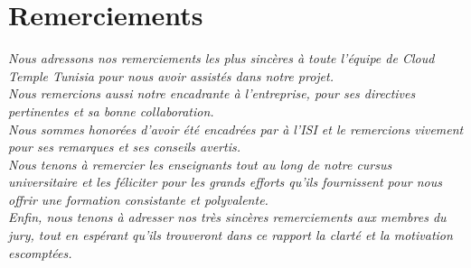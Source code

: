 \chapter*{\huge Remerciements}

\begin{center}
\it \Large
Nous adressons nos remerciements les plus sincères à toute l’équipe de Cloud Temple Tunisia pour nous avoir assistés dans notre projet.\\
\vskip12mm
Nous remercions aussi \textbf{\@proFramerName} notre encadrante à l’entreprise, pour ses directives pertinentes et sa bonne collaboration.\\
\vskip12mm
Nous sommes honorées d’avoir été encadrées par \textbf{\@academicFramerName} à l’ISI et le remercions vivement pour ses remarques et ses conseils avertis.\\
\vskip12mm
Nous tenons à remercier les enseignants tout au long de notre cursus universitaire et les féliciter pour les grands efforts qu’ils fournissent pour nous offrir une formation consistante et polyvalente.\\
\vskip12mm
Enfin, nous tenons à adresser nos très sincères remerciements aux membres du jury, tout en espérant qu’ils trouveront dans ce rapport la clarté et la motivation escomptées.
\end{center}